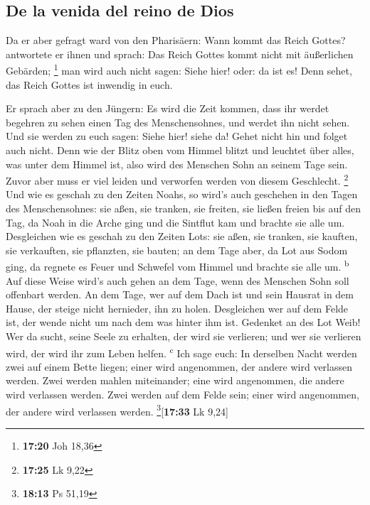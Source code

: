 \hypertarget{de-la-venida-del-reino-de-dios}{%
\subsection{De la venida del reino de
Dios}\label{de-la-venida-del-reino-de-dios}}

 Da er aber gefragt ward von den Pharisäern: Wann kommt
das Reich Gottes? antwortete er ihnen und sprach: Das Reich Gottes kommt
nicht mit äußerlichen Gebärden; \footnote{\textbf{17:20} Joh 18,36}
 man wird auch nicht sagen: Siehe hier! oder: da ist es!
Denn sehet, das Reich Gottes ist inwendig in euch.

 Er sprach aber zu den Jüngern: Es wird die Zeit kommen,
dass ihr werdet begehren zu sehen einen Tag des Menschensohnes, und
werdet ihn nicht sehen.  Und sie werden zu euch sagen:
Siehe hier! siehe da! Gehet nicht hin und folget auch nicht.
 Denn wie der Blitz oben vom Himmel blitzt und leuchtet
über alles, was unter dem Himmel ist, also wird des Menschen Sohn an
seinem Tage sein.  Zuvor aber muss er viel leiden und
verworfen werden von diesem Geschlecht. \footnote{\textbf{17:25} Lk 9,22}
 Und wie es geschah zu den Zeiten Noahs, so wird's auch
geschehen in den Tagen des Menschensohnes:  sie aßen, sie
tranken, sie freiten, sie ließen freien bis auf den Tag, da Noah in die
Arche ging und die Sintflut kam und brachte sie alle um. 
Desgleichen wie es geschah zu den Zeiten Lots: sie aßen, sie tranken,
sie kauften, sie verkauften, sie pflanzten, sie bauten; 
an dem Tage aber, da Lot aus Sodom ging, da regnete es Feuer und
Schwefel vom Himmel und brachte sie alle um. \textsuperscript{b}
 Auf diese Weise wird's auch gehen an dem Tage, wenn des
Menschen Sohn soll offenbart werden.  An dem Tage, wer
auf dem Dach ist und sein Hausrat in dem Hause, der steige nicht
hernieder, ihn zu holen. Desgleichen wer auf dem Felde ist, der wende
nicht um nach dem was hinter ihm ist.  Gedenket an des
Lot Weib!  Wer da sucht, seine Seele zu erhalten, der
wird sie verlieren; und wer sie verlieren wird, der wird ihr zum Leben
helfen. \textsuperscript{c}  Ich sage euch: In derselben
Nacht werden zwei auf einem Bette liegen; einer wird angenommen, der
andere wird verlassen werden.  Zwei werden mahlen
miteinander; eine wird angenommen, die andere wird verlassen werden.
 Zwei werden auf dem Felde sein; einer wird angenommen,
der andere wird verlassen werden. \footnote{\textbf{18:13} Ps 51,19}{[}\textbf{17:33}
Lk 9,24{]}

